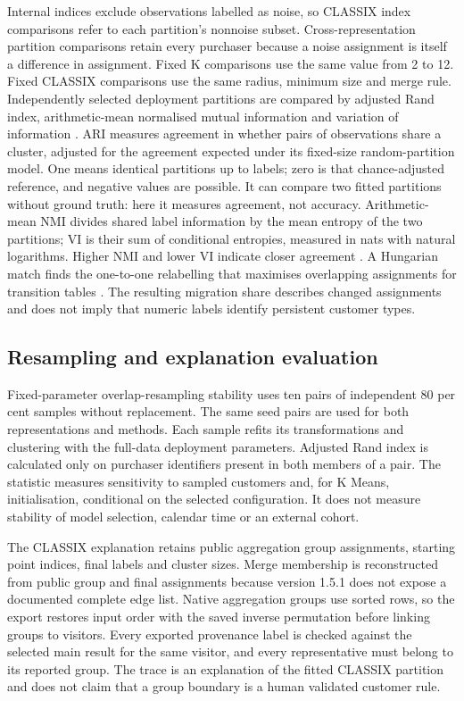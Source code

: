 Internal indices exclude observations labelled as noise, so CLASSIX index comparisons refer to each partition's nonnoise subset. Cross-representation partition comparisons retain every purchaser because a noise assignment is itself a difference in assignment. Fixed K comparisons use the same value from 2 to 12. Fixed CLASSIX comparisons use the same radius, minimum size and merge rule. Independently selected deployment partitions are compared by adjusted Rand index, arithmetic-mean normalised mutual information and variation of information \citep{hubert1985partitions,meila2007vi}. ARI measures agreement in whether pairs of observations share a cluster, adjusted for the agreement expected under its fixed-size random-partition model. One means identical partitions up to labels; zero is that chance-adjusted reference, and negative values are possible. It can compare two fitted partitions without ground truth: here it measures agreement, not accuracy. Arithmetic-mean NMI divides shared label information by the mean entropy of the two partitions; VI is their sum of conditional entropies, measured in nats with natural logarithms. Higher NMI and lower VI indicate closer agreement \citep{sklearn172,meila2007vi}. A Hungarian match finds the one-to-one relabelling that maximises overlapping assignments for transition tables \citep{kuhn1955hungarian}. The resulting migration share describes changed assignments and does not imply that numeric labels identify persistent customer types.

\subsection{Resampling and explanation evaluation}

Fixed-parameter overlap-resampling stability uses ten pairs of independent 80 per cent samples without replacement. The same seed pairs are used for both representations and methods. Each sample refits its transformations and clustering with the full-data deployment parameters. Adjusted Rand index is calculated only on purchaser identifiers present in both members of a pair. The statistic measures sensitivity to sampled customers and, for K Means, initialisation, conditional on the selected configuration. It does not measure stability of model selection, calendar time or an external cohort.

The CLASSIX explanation retains public aggregation group assignments, starting point indices, final labels and cluster sizes. Merge membership is reconstructed from public group and final assignments because version 1.5.1 does not expose a documented complete edge list. Native aggregation groups use sorted rows, so the export restores input order with the saved inverse permutation before linking groups to visitors. Every exported provenance label is checked against the selected main result for the same visitor, and every representative must belong to its reported group. The trace is an explanation of the fitted CLASSIX partition and does not claim that a group boundary is a human validated customer rule.

